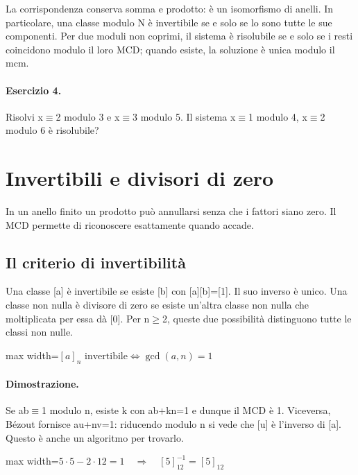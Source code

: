 \documentclass[a4paper,11pt]{article}
\begin{document}
La corrispondenza conserva somma e prodotto: è un isomorfismo di anelli. In particolare, una classe modulo N è invertibile se e solo se lo sono tutte le sue componenti. Per due moduli non coprimi, il sistema è risolubile se e solo se i resti coincidono modulo il loro MCD; quando esiste, la soluzione è unica modulo il mcm.

\paragraph{Esercizio 4.} Risolvi x$\equiv$2 modulo 3 e x$\equiv$3 modulo 5. Il sistema x$\equiv$1 modulo 4, x$\equiv$2 modulo 6 è risolubile?

\section{Invertibili e divisori di zero}

In un anello finito un prodotto può annullarsi senza che i fattori siano zero. Il MCD permette di riconoscere esattamente quando accade.

\subsection{Il criterio di invertibilità}

Una classe [a] è invertibile se esiste [b] con [a][b]=[1]. Il suo inverso è unico. Una classe non nulla è divisore di zero se esiste un’altra classe non nulla che moltiplicata per essa dà [0]. Per n$\ge$2, queste due possibilità distinguono tutte le classi non nulle.

\begin{center}\begin{adjustbox}{max width=\linewidth}$\displaystyle [a]_n\text{ invertibile}\iff\gcd(a,n)=1$\end{adjustbox}\end{center}

\paragraph{Dimostrazione.} Se ab$\equiv$1 modulo n, esiste k con ab+kn=1 e dunque il MCD è 1. Viceversa, Bézout fornisce au+nv=1: riducendo modulo n si vede che [u] è l’inverso di [a]. Questo è anche un algoritmo per trovarlo.

\begin{center}\begin{adjustbox}{max width=\linewidth}$\displaystyle 5\cdot5-2\cdot12=1\quad\Longrightarrow\quad[5]_{12}^{-1}=[5]_{12}$\end{adjustbox}\end{center}
\end{document}
